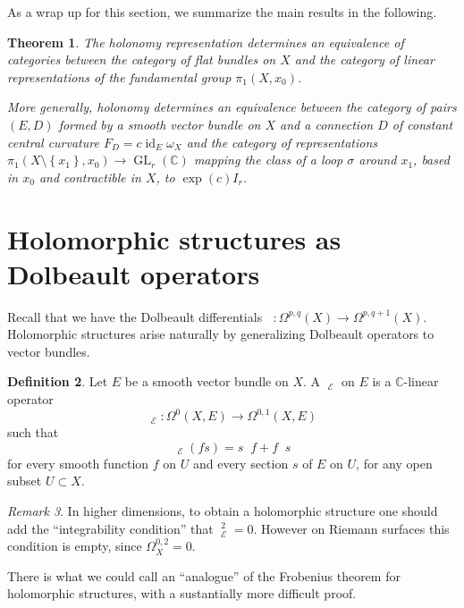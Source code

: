 \documentclass[12pt,a4paper]{amsbook}
\newtheorem{thm}{Theorem}[chapter]
\theoremstyle{remark} \newtheorem{rmk}[thm]{Remark}
\theoremstyle{definition} \newtheorem{defn}[thm]{Definition}
\theoremstyle{definition} \newtheorem{ex}[thm]{Example}
\theoremstyle{definition} \newtheorem{ej}{Exercise}
\let\emph\relax
\newcommand{\C}{\mathbb C}
\newcommand{\sE}{\mathscr E}
\DeclareMathOperator{\GL}{GL}
\DeclareMathOperator{\id}{id}
\DeclareMathOperator{\delbar}{\bar{\partial}}
\begin{document}
As a wrap up for this section, we summarize the main results in the following.

\begin{thm}
  The holonomy representation determines an equivalence of categories between the category of flat bundles on $X$ and the category of linear representations of the fundamental group $\pi_1(X,x_0)$.

  More generally, holonomy determines an equivalence between the category of pairs $(E,D)$ formed by a smooth vector bundle on $X$ and a connection $D$ of constant central curvature $F_D=c\id_E \omega_X$ and the category of representations $\pi_1(X\setminus \left\{ x_1 \right\},x_0)\rightarrow \GL_r(\C)$ mapping the class of a loop $\sigma$ around $x_1$, based in $x_0$ and contractible in $X$, to $\exp(c)I_r$.
\end{thm}

\section{Holomorphic structures as Dolbeault operators}
Recall that we have the Dolbeault differentials $\delbar: \Omega^{p,q}(X)\rightarrow \Omega^{p,q+1}(X)$. Holomorphic structures arise naturally by generalizing Dolbeault operators to vector bundles.

\begin{defn}
Let $E$ be a smooth vector bundle on $X$. A \emph{holomorphic structure} $\delbar_{\sE}$ on $E$ is a $\C$-linear operator
\begin{equation*}
\delbar_{\sE}: \Omega^0(X,E) \rightarrow \Omega^{0,1}(X,E)
\end{equation*} 
such that
\begin{equation*}
\delbar_{\sE}(fs)=s \delbar f + f \delbar s
\end{equation*} 
for every smooth function $f$ on $U$ and every section $s$ of $E$ on $U$, for any open subset $U\subset X$. 
\end{defn}

\begin{rmk}
In higher dimensions, to obtain a holomorphic structure one should add the ``integrability condition'' that $\delbar_{\sE}^2 = 0$. However on Riemann surfaces this condition is empty, since  $\Omega_X^{0,2}=0$.
\end{rmk}

There is what we could call an ``analogue'' of the Frobenius theorem for holomorphic structures, with a sustantially more difficult proof.
\end{document}
